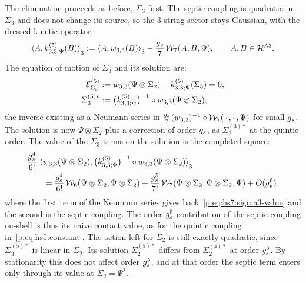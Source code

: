 The elimination proceeds as before, $\Sigma_3$ first.
The septic coupling is quadratic in $\Sigma_3$ and does not change its source, so the $3$-string sector stays Gaussian, with the dressed kinetic operator:
\begin{equation}
  \label{p:eq:hs7:dressed-3}
  \pair[3]{A}{\kin{3}{\Psi}{5}(B)}
    := \pair[3]{A}{\wprod{3}{3}(B)} - \frac{\gs}{7} \, \dvertex{7}(A, B, \Psi),
  \qquad
  A, B \in \Hn{3}.
\end{equation}
The equation of motion of $\Sigma_3$ and its solution are:
\begin{equation}
  \label{p:eq:hs7:saddle-3}
  \begin{aligned}
    \mathcal E^{(5)}_{\Sigma_3}
      &
      := \wprod{3}{3}(\Psi \otimes \Sigma_2) - \kin{3}{\Psi}{5}(\Sigma_3)
      = 0,
    \\
    \Sigma_3^{(5)*}
      &
      := \big( \kin{3}{\Psi}{5} \big)^{-1} \circ \wprod{3}{3}(\Psi \otimes \Sigma_2),
  \end{aligned}
\end{equation}
the inverse existing as a Neumann series in $\tfrac{g_s}{7} (w_{3,3})^{-1} \circ \mathcal{W}_{7}(\, \cdot \,, \cdot \,, \Psi)$ for small $g_s$.
The solution is now $\Psi \otimes \Sigma_2$ plus a correction of order $g_s$, as $\Sigma_2^{(3)*}$ at the quintic order.
The value of the $\Sigma_3$ terms on the solution is the completed square:
\begin{equation}
  \label{p:eq:hs7:sigma3-value-5}
  \begin{aligned}
    &
    \frac{\gs^4}{6!} \, \pair[3]{\wprod{3}{3}(\Psi \otimes \Sigma_2)}{\big( \kin{3}{\Psi}{5} \big)^{-1} \circ \wprod{3}{3}(\Psi \otimes \Sigma_2)}
    \\ &
    \qquad
    = \frac{\gs^4}{6!} \, \dvertex{6}(\Psi \otimes \Sigma_2, \Psi \otimes \Sigma_2)
      + \frac{\gs^5}{7!} \, \dvertex{7}(\Psi \otimes \Sigma_2, \Psi \otimes \Sigma_2, \Psi)
      + O(\gs^6),
  \end{aligned}
\end{equation}
where the first term of the Neumann series gives back~\eqref{p:eq:hs7:sigma3-value} and the second is the septic coupling.
The order-$g_s^5$ contribution of the septic coupling on-shell is thus its naive contact value, as for the quintic coupling in~\eqref{p:eq:hs5:constant}.
The action left for $\Sigma_2$ is still exactly quadratic, since $\Sigma_3^{(5)*}$ is linear in $\Sigma_2$.
Its solution $\Sigma_2^{(5)*}$ differs from $\Sigma_2^{(4)*}$ at order $g_s^3$.
By stationarity this does not affect order $g_s^5$, and at that order the septic term enters only through its value at $\Sigma_2 = \Psi^2$.

